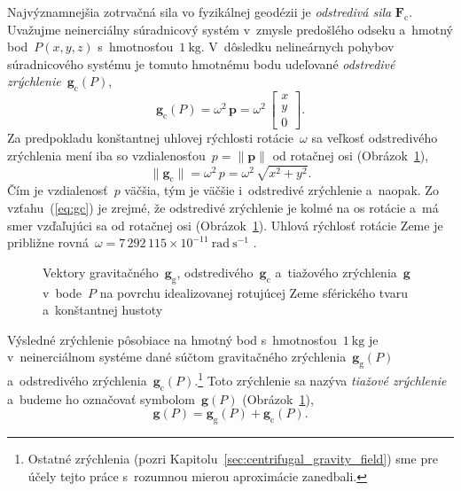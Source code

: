 \documentclass[a4paper,12pt]{book}
\newcommand{\gidx}{\mathrm g}
\newcommand{\cidx}{\mathrm c}
\let\vec\mathbf
\begin{document}
Najvýznamnejšia zotrvačná sila vo fyzikálnej geodézii je \emph{odstredivá sila}
$\vec F_\cidx$.  Uvažujme neinerciálny súradnicový systém v~zmysle predošlého
odseku a~hmotný bod~$P(x, y, z)$ s~hmotnosťou~$1\ \mathrm{kg}$.  V~dôsledku
nelineárnych pohybov súradnicového systému je tomuto hmotnému bodu udeľované
\emph{odstredivé zrýchlenie}~$\vec g_\cidx(P)$,
%
\begin{equation}
\label{eq:gc}
\vec g_\cidx(P) = \omega^2 \, \vec p =
%
\omega^2 \, \begin{bmatrix}
x\\
y\\
0
\end{bmatrix}
{.}
\end{equation}
%
Za predpokladu konštantnej uhlovej rýchlosti rotácie~$\omega$ sa veľkosť
odstredivého zrýchlenia mení iba so vzdialenosťou~$p = \| \vec p \|$ od 
rotačnej osi (Obrázok~\ref{fig:gravity_vector}),
%
\begin{equation}
\| \vec g_\cidx \| = \omega^2 \, p = \omega^2 \, \sqrt{x^2 + y^2}{.}
\end{equation}
%
Čím je vzdialenosť~$p$ väčšia, tým je väčšie i~odstredivé zrýchlenie a~naopak.
Zo vzťahu~(\ref{eq:gc}) je zrejmé, že odstredivé zrýchlenie je kolmé na os
rotácie a~má smer vzďaľujúci sa od rotačnej osi
(Obrázok~\ref{fig:gravity_vector}).  Uhlová rýchlosť rotácie Zeme je približne
rovná~$\omega = 7\, 292\, 115 \times 10^{-11} \ \mathrm{rad} \ \mathrm{s}^{-1}$ 
\parencite{GRS80}{.}

\begin{figure}
\centering

\caption{Vektory gravitačného~$\vec g_\gidx$, odstredivého~$\vec g_\cidx$
a~tiažového zrýchlenia~$\vec g$ v~bode~$P$ na povrchu idealizovanej rotujúcej
Zeme sférického tvaru a~konštantnej hustoty}
\label{fig:gravity_vector}
\end{figure}

Výsledné zrýchlenie pôsobiace na hmotný bod s~hmotnosťou~$1 \ \mathrm{kg}$ je
v~neinerciálnom systéme dané súčtom gravitačného zrýchlenia~$\vec g_\gidx(P)$
a~odstredivého zrýchlenia~$\vec g_\cidx(P)$.\footnote{Ostatné zrýchlenia (pozri
Kapitolu~\ref{sec:centrifugal_gravity_field}) sme pre účely tejto práce 
s~rozumnou mierou aproximácie zanedbali.}  Toto zrýchlenie sa nazýva 
\emph{tiažové zrýchlenie} a~budeme ho označovať symbolom~$\vec g(P)$ 
(Obrázok~\ref{fig:gravity_vector}),
%
\begin{equation}
\label{eq:g}
\vec g(P) = \vec g_\gidx(P) + \vec g_\cidx(P){.}
\end{equation}
\end{document}

